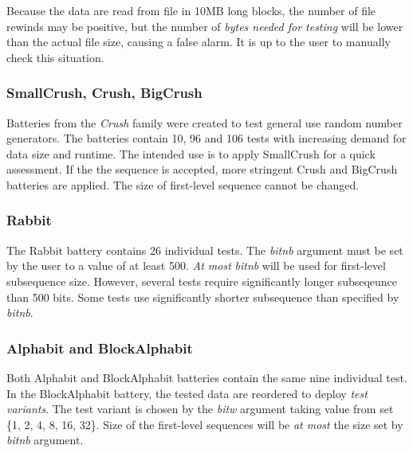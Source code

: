 \documentclass[
  digital,     %
  oneside,     %
  nosansbold,  %
  nocolorbold, %
  nolof,         %
  nolot,         %
]{fithesis4}
\begin{document}
Because the data are read from file in 10MB long blocks, the number of file rewinds may be positive, but the number of \emph{bytes needed for testing} will be lower than the actual file size, causing a false alarm. It is up to the user to manually check this situation. %


\subsubsection{SmallCrush, Crush, BigCrush}
Batteries from the \emph{Crush} family were created to test general use random number generators. The batteries contain 10, 96 and 106 tests with increasing demand for data size and runtime. The intended use is to apply SmallCrush for a quick assessment. If the the sequence is accepted, more stringent Crush and BigCrush batteries are applied. The size of first-level sequence cannot be changed. \cite[p. 242]{tu01_guide}

\subsubsection{Rabbit}
The Rabbit battery contains 26 individual tests. The \emph{bit\textunderscore nb} argument must be set by the user to a value of at least 500. \emph{At most} \emph{bit\textunderscore nb} will be used for first-level subsequence size. \cite[p. 152]{tu01_guide} However, several tests require significantly longer subseqeunce than 500 bits. Some tests use significantly shorter subsequence than specified by \emph{bit\textunderscore nb}.

\subsubsection{Alphabit and BlockAlphabit}
Both Alphabit and BlockAlphabit batteries contain the same nine individual test. In the BlockAlphabit battery, the tested data are reordered to deploy \emph{test variants}. The test variant is chosen by the \emph{bit\textunderscore w} argument taking value from set \{1, 2, 4, 8, 16, 32\}. \cite[p. 155]{tu01_guide} Size of the first-level sequences will be \emph{at most} the size set by \emph{bit\textunderscore nb} argument.


\end{document}
